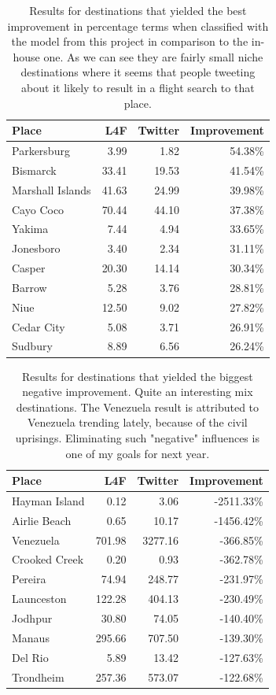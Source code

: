 \documentclass[minf,twoside,singlespacing,parskip,frontabs,notimes,11pt]{infthesis}
\begin{document}
\begin{table}[]
\begin{center}
\begin{tabular}{ l | r | r | r}
Place & L4F & Twitter & Improvement \\
\hline
Parkersburg & 3.99 & 1.82 & 54.38\% \\
Bismarck & 33.41 & 19.53 & 41.54\% \\
Marshall Islands & 41.63 & 24.99 & 39.98\% \\
Cayo Coco & 70.44 & 44.10 & 37.38\% \\
Yakima & 7.44 & 4.94 & 33.65\% \\
Jonesboro & 3.40 & 2.34 & 31.11\% \\
Casper & 20.30 & 14.14 & 30.34\% \\
Barrow & 5.28 & 3.76 & 28.81\% \\
Niue & 12.50 & 9.02 & 27.82\% \\
Cedar City & 5.08 & 3.71 & 26.91\% \\
Sudbury & 8.89 & 6.56 & 26.24\% \\
\end{tabular}
\end{center}
\caption{Results for destinations that yielded the best improvement in percentage terms when classified with the model from this project in comparison to the in-house one. As we can see they are fairly small niche destinations where it seems that people tweeting about it likely to result in a flight search to that place.}
\label{4-1}
\end{table}

\begin{table}[]
\begin{center}
\begin{tabular}{ l | r | r | r}
Place & L4F & Twitter & Improvement \\
\hline
Hayman Island & 0.12 & 3.06 & -2511.33\% \\
Airlie Beach & 0.65 & 10.17 & -1456.42\% \\
Venezuela & 701.98 & 3277.16 & -366.85\% \\
Crooked Creek & 0.20 & 0.93 & -362.78\% \\
Pereira & 74.94 & 248.77 & -231.97\% \\
Launceston & 122.28 & 404.13 & -230.49\% \\
Jodhpur & 30.80 & 74.05 & -140.40\% \\
Manaus & 295.66 & 707.50 & -139.30\% \\
Del Rio & 5.89 & 13.42 & -127.63\% \\
Trondheim & 257.36 & 573.07 & -122.68\%
\end{tabular}
\end{center}
\caption{Results for destinations that yielded the biggest negative improvement. Quite an interesting mix destinations. The Venezuela result is attributed to Venezuela trending lately, because of the civil uprisings. Eliminating such "negative" influences is one of my goals for next year.}
\label{4-2}
\end{table}
\end{document}

